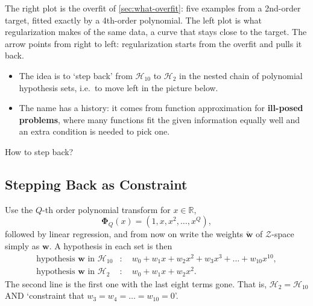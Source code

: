 The right plot is the overfit of \autoref{sec:what-overfit}: five examples
from a 2nd-order target, fitted exactly by a 4th-order polynomial. The left
plot is what regularization makes of the same data, a curve that stays close
to the target. The arrow points from right to left: regularization starts from
the overfit and pulls it back.

\begin{itemize}
    \item The idea is to `step back' from \(\mathcal{H}_{10}\) to
        \(\mathcal{H}_2\) in the nested chain of polynomial hypothesis sets,
        i.e.\ to move left in the picture below.
        \begin{center}
            \nestedH
        \end{center}
    \item The name has a history: it comes from function approximation for
        \textbf{ill-posed problems}, where many functions fit the given
        information equally well and an extra condition is needed to pick
        one.
\end{itemize}

\begin{question}
    How to step back?
\end{question}

\subsection{Stepping Back as Constraint}

\begin{center}
    \nestedH
\end{center}

Use the \(Q\)-th order polynomial transform for \(x \in \mathbb{R}\),
\[
    \bm{\Phi}_Q(x) = \left( 1, x, x^2, \ldots, x^Q \right),
\]
followed by linear regression, and from now on write the weights
\(\tilde{\bm{w}}\) of \(\mathcal{Z}\)-space simply as \(\bm{w}\). A hypothesis
in each set is then
\begin{align*}
    \text{hypothesis } \bm{w} \text{ in } \mathcal{H}_{10}&: \quad w_0 + w_1 x
    + w_2 x^2 + w_3 x^3 + \ldots + w_{10} x^{10} ,\\
    \text{hypothesis } \bm{w} \text{ in } \mathcal{H}_2&: \quad w_0 + w_1 x +
    w_2 x^2 .
\end{align*}
The second line is the first one with the last eight terms gone. That is,
\(\mathcal{H}_2 = \mathcal{H}_{10}\) AND `constraint that \(w_3 = w_4 = \ldots
= w_{10} = 0\)'.

